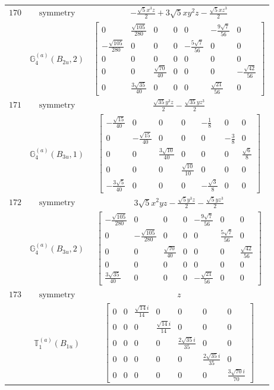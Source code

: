 \documentclass[fleqn,8pt,landscape]{jsarticle}
\begin{document}
\begin{longtable}{ccc}
$ 170 $ & $ \text{symmetry} $ & $ - \frac{\sqrt{5} x^{3} z}{2} + 3 \sqrt{5} x y^{2} z - \frac{\sqrt{5} x z^{3}}{2} $ \\
$  $ & $ \mathbb{G}_{4}^{(a)}(B_{2u},2) $ & $ \begin{bmatrix} 0 & \frac{\sqrt{105}}{280} & 0 & 0 & 0 & - \frac{9 \sqrt{7}}{56} & 0 \\ - \frac{\sqrt{105}}{280} & 0 & 0 & 0 & - \frac{5 \sqrt{7}}{56} & 0 & 0 \\ 0 & 0 & 0 & 0 & 0 & 0 & 0 \\ 0 & 0 & \frac{\sqrt{70}}{40} & 0 & 0 & 0 & - \frac{\sqrt{42}}{56} \\ 0 & \frac{3 \sqrt{35}}{40} & 0 & 0 & 0 & \frac{\sqrt{21}}{56} & 0 \end{bmatrix} $ \\ \hline
$ 171 $ & $ \text{symmetry} $ & $ \frac{\sqrt{35} y^{3} z}{2} - \frac{\sqrt{35} y z^{3}}{2} $ \\
$  $ & $ \mathbb{G}_{4}^{(a)}(B_{3u},1) $ & $ \begin{bmatrix} - \frac{\sqrt{15}}{40} & 0 & 0 & 0 & - \frac{1}{8} & 0 & 0 \\ 0 & - \frac{\sqrt{15}}{40} & 0 & 0 & 0 & - \frac{3}{8} & 0 \\ 0 & 0 & \frac{3 \sqrt{10}}{40} & 0 & 0 & 0 & \frac{\sqrt{6}}{8} \\ 0 & 0 & 0 & \frac{\sqrt{10}}{10} & 0 & 0 & 0 \\ - \frac{3 \sqrt{5}}{40} & 0 & 0 & 0 & - \frac{\sqrt{3}}{8} & 0 & 0 \end{bmatrix} $ \\ \hline
$ 172 $ & $ \text{symmetry} $ & $ 3 \sqrt{5} x^{2} y z - \frac{\sqrt{5} y^{3} z}{2} - \frac{\sqrt{5} y z^{3}}{2} $ \\
$  $ & $ \mathbb{G}_{4}^{(a)}(B_{3u},2) $ & $ \begin{bmatrix} - \frac{\sqrt{105}}{280} & 0 & 0 & 0 & - \frac{9 \sqrt{7}}{56} & 0 & 0 \\ 0 & - \frac{\sqrt{105}}{280} & 0 & 0 & 0 & \frac{5 \sqrt{7}}{56} & 0 \\ 0 & 0 & \frac{\sqrt{70}}{40} & 0 & 0 & 0 & \frac{\sqrt{42}}{56} \\ 0 & 0 & 0 & 0 & 0 & 0 & 0 \\ \frac{3 \sqrt{35}}{40} & 0 & 0 & 0 & - \frac{\sqrt{21}}{56} & 0 & 0 \end{bmatrix} $ \\ \hline
$ 173 $ & $ \text{symmetry} $ & $ z $ \\
$  $ & $ \mathbb{T}_{1}^{(a)}(B_{1u}) $ & $ \begin{bmatrix} 0 & 0 & \frac{\sqrt{14} i}{14} & 0 & 0 & 0 & 0 \\ 0 & 0 & 0 & \frac{\sqrt{14} i}{14} & 0 & 0 & 0 \\ 0 & 0 & 0 & 0 & \frac{2 \sqrt{35} i}{35} & 0 & 0 \\ 0 & 0 & 0 & 0 & 0 & \frac{2 \sqrt{35} i}{35} & 0 \\ 0 & 0 & 0 & 0 & 0 & 0 & \frac{3 \sqrt{70} i}{70} \end{bmatrix} $ \\ \hline

\end{longtable}
\end{document}
